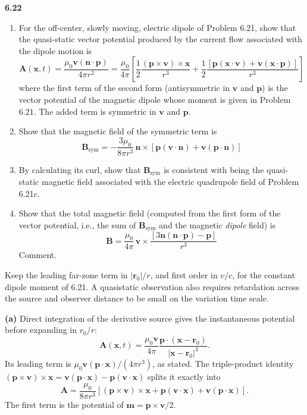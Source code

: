 \par\bigskip
\noindent\textbf{6.22}\quad\begin{enumerate}
\item[(a)] For the off-center, slowly moving, electric dipole of Problem 6.21, show that  the quasi-static vector potential produced by the current flow associated with the dipole motion is
\[
\mathbf{A}(\mathbf{x},t)=\frac{\mu_{0}\mathbf{v}(\mathbf{n}\cdot\mathbf{p})}{4\pi r^{2}}=\frac{\mu_{0}}{4\pi}\left[\frac{1}{2}\frac{(\mathbf{p}\times\mathbf{v})\times\mathbf{x}}{r^{3}}+\frac{1}{2}\frac{[\mathbf{p}(\mathbf{x}\cdot\mathbf{v})+\mathbf{v}(\mathbf{x}\cdot\mathbf{p})]}{r^{3}}\right]
\]
where the first term of the second form (antisymmetric in $\mathbf{v}$ and $\mathbf{p}$) is the vector potential of the magnetic dipole whose moment is given in Problem 6.21. The added term is symmetric in $\mathbf{v}$ and $\mathbf{p}$.
\item[(b)] Show that the magnetic field of the symmetric term is
\[
\mathbf{B}_{\mathrm{sym}}=-\frac{3\mu_{0}}{8\pi r^{3}}\,\mathbf{n}\times[\mathbf{p}(\mathbf{v}\cdot\mathbf{n})+\mathbf{v}(\mathbf{p}\cdot\mathbf{n})]
\]
\item[(c)] By calculating its curl, show that $\mathbf{B}_{\mathrm{sym}}$ is consistent with being the quasi-static magnetic field associated with the electric quadrupole field of Problem 6.21c.
\item[(d)] Show that the total magnetic field (computed from the first form of the vector potential, i.e., the sum of $\mathbf{B}_{\mathrm{sym}}$ and the magnetic \emph{dipole} field) is
\[
\mathbf{B}=\frac{\mu_{0}}{4\pi}\,\mathbf{v}\times\frac{[3\mathbf{n}(\mathbf{n}\cdot\mathbf{p})-\mathbf{p}]}{r^{3}}
\]
Comment.
\end{enumerate}
\solution

Keep the leading far-zone term in $|\mathbf r_0|/r$, and first order in
$v/c$, for the constant dipole moment of 6.21. A quasistatic observation
also requires retardation across the source and observer distance to be
small on the variation time scale.

\textbf{(a)} Direct integration of the derivative source gives the
instantaneous potential before expanding in $r_0/r$:
\[
\mathbf A(\mathbf x,t)=\frac{\mu_0\mathbf v}{4\pi}
\frac{\mathbf p\cdot(\mathbf x-\mathbf r_0)}{|\mathbf x-\mathbf r_0|^3}.
\]
Its leading term is
$\mu_0\mathbf v(\mathbf p\cdot\mathbf x)/(4\pi r^3)$, as stated.
The triple-product identity
$(\mathbf p\times\mathbf v)\times\mathbf x
=\mathbf v(\mathbf p\cdot\mathbf x)-\mathbf p(\mathbf v\cdot\mathbf x)$
splits it exactly into
\[
\boxed{\mathbf A=\frac{\mu_0}{8\pi r^3}
\left[(\mathbf p\times\mathbf v)\times\mathbf x
+\mathbf p(\mathbf v\cdot\mathbf x)+\mathbf v(\mathbf p\cdot\mathbf x)\right]}.
\]
The first term is the potential of $\mathbf m=\mathbf p\times\mathbf v/2$.

